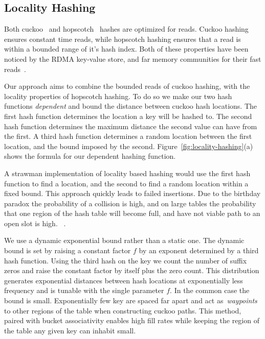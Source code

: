 \subsection{Locality Hashing}
Both cuckoo~\cite{cuckoo} and hopscotch~\cite{hopscotch}
hashes are optimized for reads. Cuckoo hashing ensures
constant time reads, while hopscotch hashing ensures that a
read is within a bounded range of it's hash index. Both of
these properties have been noticed by the RDMA key-value
store, and far memory communities for their fast
reads~\cite{memc3,cuckoo-improvements,pilaf,farm}.

Our approach aims to combine the bounded reads of cuckoo
hashing, with the locality properties of hopscotch hashing.
To do so we make our two hash functions \textit{dependent}
and bound the distance between cuckoo hash locations.  The
first hash function determines the location a key will be
hashed to. The second hash function determines the maximum
distance the second value can have from the first. A third
hash function determines a random location between the first
location, and the bound imposed by the second.
Figure~\ref{fig:locality-hashing}(a) shows the formula for
our dependent hashing function.

A strawman implementation of locality based hashing would
use the first hash function to find a location, and the
second to find a random location within a fixed bound. This
approach quickly leads to failed insertions. Due to the
birthday paradox the probability of a collision is high, and
on large tables the probability that one region of the hash
table will become full, and have not viable path to an open
slot is high. ~.

We use a dynamic exponential bound rather than a static one.
The dynamic bound is set by raising a constant factor $f$ by
an exponent determined by a third hash function. Using the
third hash on the key we count the number of suffix zeros
and raise the constant factor by itself plus the zero count.
This distribution generates exponential distances between
hash locations at exponentially less frequency and is
tunable with the single parameter $f$.
In the common case the bound is small. Exponentially few key
are spaced far apart and act as~\textit{waypoints} to other
regions of the table when constructing cuckoo paths. This
method, paired with bucket associativity enables high fill
rates while keeping the region of the table any given key
can inhabit small.


